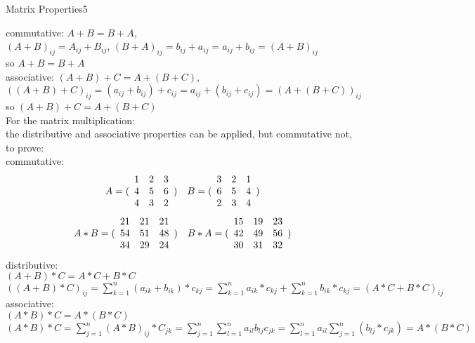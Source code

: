 \begin{questions}
\begin{question}{Matrix Properties}{5}
    
    commutative:  $ A + B  =  B + A$, \\ \quad $ (A+B)_{ij}  =  A_{ij} + B_{ij} $, 
    \quad $(B + A)_{ij}  =  b_{ij} + a_{ij} = a_{ij} + b_{ij} = (A+B)_{ij} $ \\
    so $ A + B  =  B + A$   \\ 
    associative:  $(A+B)+C = A +(B+C)$, \\ 
    $((A+B)+C)_{ij} = ( a_{ij} + b_{ij} ) + c_{ij} =  a_{ij} + ( b_{ij}  + c_{ij} ) = (A+(B+C))_{ij} $ \\
    so $ (A+B)+C = A+(B+C) $ \\
    For the matrix multiplication:\\
    the distributive and associative properties can be applied, but commutative not, to prove:\\
    commutative:
    \begin{align*}
        A = ( \begin{array}{c c c} 
            1 & 2 & 3 \\
            4 & 5 & 6 \\ 
            4 & 3 & 2 \end{array} )  \quad
        B = ( \begin{array}{c c c} 
            3 & 2 & 1 \\
            6 & 5 & 4 \\ 
            2 & 3 & 4 \end{array} )  
    \end{align*}
    \begin{align*}
        A * B = ( \begin{array}{c c c} 
            21 & 21 & 21 \\
            54 & 51 & 48 \\ 
            34 & 29 & 24 \end{array} )  \quad
        B * A = ( \begin{array}{c c c} 
            15 & 19 & 23 \\
            42 & 49 & 56 \\ 
            30 & 31 & 32 \end{array} )  
    \end{align*}
    distributive:\\
    $(A+B)*C=A*C+B*C$\\
    $((A+B)*C)_{ij} = \sum_{k=1}^n { (a_{ik}+b_{ik} )*c_{kj} } = \sum_{k=1}^n { a_{ik}*c_{kj} } + \sum_{k=1}^n{b_{ik}*c_{kj} }
    = (A*C + B*C  )_{ij} $\\
    associative:\\
    $(A*B)*C = A*(B*C)$\\
    $(A*B)*C = \sum_{j=1}^n (A*B)_{ij}*C_{jk} = \sum_{j=1}^n \sum_{l=1}^n a_{il}b_{lj}c_{jk} 
    = \sum_{l=1}^n {a_{il}} \sum_{j=1}^n(b_{lj}*c_{jk}) = A*(B*C) $
\end{question}


\end{questions}
